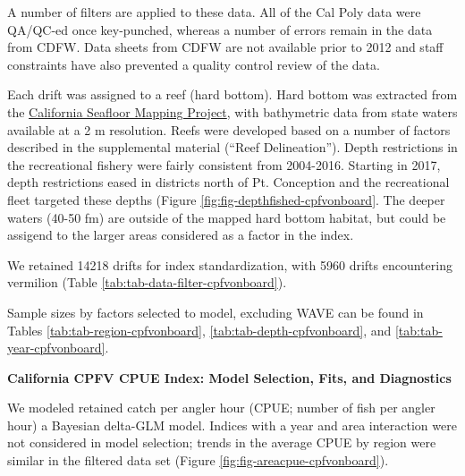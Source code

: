 \documentclass[
]{article}
\begin{document}
A number of filters are applied to these data. All of the Cal Poly data were
QA/QC-ed once key-punched, whereas a number of errors remain in the
data from CDFW. Data sheets from CDFW are not available prior to 2012 and
staff constraints have also prevented a quality control review of the data.

Each drift was assigned to a reef (hard bottom). Hard bottom was extracted from
the \href{http://seafloor.otterlabs.org/index.html}{California Seafloor Mapping Project},
with bathymetric data from state waters available at a 2 m resolution. Reefs were
developed based on a number of factors described in the supplemental material
(``Reef Delineation''). Depth restrictions in the recreational fishery were fairly
consistent from 2004-2016. Starting in 2017, depth restrictions eased in districts
north of Pt. Conception and the recreational fleet targeted these depths
(Figure \ref{fig:fig-depthfished-cpfvonboard}. The deeper waters (40-50 fm) are
outside of the mapped hard bottom habitat, but could be assigend to the larger
areas considered as a factor in the index.

We retained 14218 drifts for index standardization, with
5960 drifts encountering vermilion
(Table \ref{tab:tab-data-filter-cpfvonboard}).

Sample sizes by factors selected to model, excluding WAVE can be found in Tables
\ref{tab:tab-region-cpfvonboard}, \ref{tab:tab-depth-cpfvonboard}, and \ref{tab:tab-year-cpfvonboard}.

\textbf{California CPFV CPUE Index: Model Selection, Fits, and Diagnostics}

We modeled retained catch per angler hour (CPUE; number of fish per angler hour)
a Bayesian delta-GLM model. Indices with a year and area interaction were not
considered in model selection; trends in the average CPUE by region were similar
in the filtered data set (Figure \ref{fig:fig-areacpue-cpfvonboard}).
\end{document}
